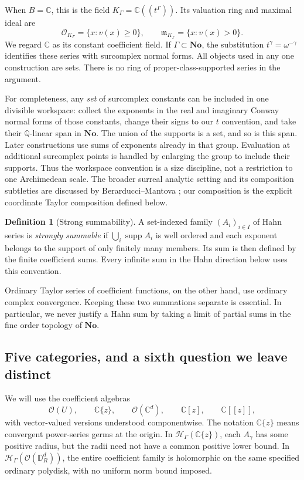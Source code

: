 \documentclass[11pt,letterpaper]{article}
\theoremstyle{definition}
\newtheorem{definition}[definition]{Definition}
\theoremstyle{remark}
\newcommand{\C}{\mathbb C}
\newcommand{\Q}{\mathbb Q}
\newcommand{\No}{\mathbf{No}}
\newcommand{\HH}{\mathscr H}
\newcommand{\OO}{\mathcal O}
\newcommand{\m}{\mathfrak m}
\newcommand{\supp}{\operatorname{supp}}
\newcommand{\DR}{\mathbb D_R^d}
\numberwithin{equation}{section}
\begin{document}
When $B=\C$, this is the field $K_\Gamma=\C((t^\Gamma))$. Its valuation
ring and maximal ideal are
\[
 \OO_{K_\Gamma}=\{x:v(x)\ge0\},\qquad
 \m_{K_\Gamma}=\{x:v(x)>0\}.
\]
We regard $\C$ as its constant coefficient field. If $\Gamma\subset\No$,
the substitution $t^\gamma=\omega^{-\gamma}$ identifies these series with
surcomplex normal forms. All objects used in any one construction are sets.
There is no ring of proper-class-supported series in the argument.

For completeness, any \emph{set} of surcomplex constants can be included in
one divisible workspace: collect the exponents in the real and imaginary
Conway normal forms of those constants, change their signs to our $t$
convention, and take their $\Q$-linear span in $\No$. The union of the
supports is a set, and so is this span. Later constructions use sums of
exponents already in that group. Evaluation at additional surcomplex points
is handled by enlarging the group to include their supports. Thus the
workspace convention is a size discipline, not a restriction to one
Archimedean scale. The broader surreal analytic setting and its composition
subtleties are discussed by Berarducci--Mantova \cite{BM}; our composition is
the explicit coordinate Taylor composition defined below.

\begin{definition}[Strong summability]\label{def:summable}
A set-indexed family $(A_i)_{i\in I}$ of Hahn series is \emph{strongly
summable} if $\bigcup_i\supp A_i$ is well ordered and each exponent belongs
to the support of only finitely many members. Its sum is then defined by the
finite coefficient sums. Every infinite sum in the Hahn direction below
uses this convention.
\end{definition}
Ordinary Taylor series of coefficient functions, on the other hand, use
ordinary complex convergence. Keeping these two summations separate is
essential. In particular, we never justify a Hahn sum by taking a limit of
partial sums in the fine order topology of $\No$.

\subsection{Five categories, and a sixth question we leave distinct}
We will use the coefficient algebras
\begin{equation}\label{eq:categories}
 \OO(U),\qquad \C\{z\},\qquad \OO(\C^d),\qquad
 \C[z],\qquad \C[[z]],
\end{equation}
with vector-valued versions understood componentwise. The notation $\C\{z\}$
means convergent power-series germs at the origin. In
$\HH_\Gamma(\C\{z\})$, each $A_\gamma$ has some positive radius, but the
radii need not have a common positive lower bound. In
$\HH_\Gamma(\OO(\DR))$, the entire coefficient family is holomorphic on
the same specified ordinary polydisk, with no uniform norm bound imposed.
\end{document}
